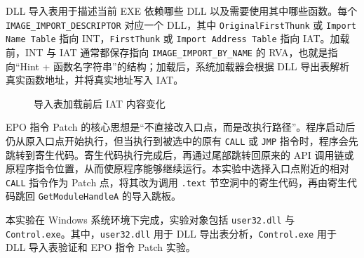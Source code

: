 ﻿\documentclass[12pt]{ctexart}
\begin{document}
DLL 导入表用于描述当前 EXE 依赖哪些 DLL 以及需要使用其中哪些函数。每个 \texttt{IMAGE\_IMPORT\_DESCRIPTOR} 对应一个 DLL，其中 \texttt{OriginalFirstThunk} 或 \texttt{Import Name Table} 指向 INT，\texttt{FirstThunk} 或 \texttt{Import Address Table} 指向 IAT。加载前，INT 与 IAT 通常都保存指向 \texttt{IMAGE\_IMPORT\_BY\_NAME} 的 RVA，也就是指向“Hint + 函数名字符串”的结构；加载后，系统加载器会根据 DLL 导出表解析真实函数地址，并将真实地址写入 IAT。

\begin{figure}[H]
\centering
{}
\caption{导入表加载前后 IAT 内容变化}
\label{fig:principle-import}
\end{figure}

EPO 指令 Patch 的核心思想是“不直接改入口点，而是改执行路径”。程序启动后仍从原入口点开始执行，但当执行到被选中的原有 \texttt{CALL} 或 \texttt{JMP} 指令时，程序会先跳转到寄生代码。寄生代码执行完成后，再通过尾部跳转回原来的 API 调用链或原程序指令位置，从而使原程序能够继续运行。本实验中选择入口点附近的相对 \texttt{CALL} 指令作为 Patch 点，将其改为调用 \texttt{.text} 节空洞中的寄生代码，再由寄生代码跳回 \texttt{GetModuleHandleA} 的导入跳板。



\vspace{0.8cm}


本实验在 Windows 系统环境下完成，实验对象包括 \texttt{user32.dll} 与 \texttt{Control.exe}。其中，\texttt{user32.dll} 用于 DLL 导出表分析，\texttt{Control.exe} 用于 DLL 导入表验证和 EPO 指令 Patch 实验。
\end{document}
